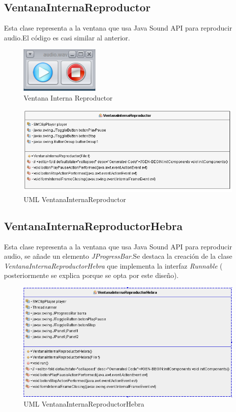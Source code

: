 \subsection{VentanaInternaReproductor}
Esta clase representa a la ventana que usa Java Sound API para reproducir audio.El código es casi similar al anterior.
\begin{figure}[H]
  \centering
    \includegraphics[scale=0.60]{images/ventanainternareproductor}
  \caption{Ventana Interna Reproductor}
  \label{Ventana Interna Reproductor}
\end{figure}

\begin{figure}[H]
  \centering
    \includegraphics[scale=0.60]{images/ventanaInternaReproductor}
  \caption{UML VentanaInternaReproductor}
  \label{VentanaInternaReproductor}
\end{figure}


\subsection{VentanaInternaReproductorHebra}
Esta clase representa a la ventana que usa Java Sound API para reproducir audio, se añade un elemento \emph{JProgressBar}.Se destaca la creación de la clase \emph{VentanaInternaReproductorHebra} que implementa la interfaz \emph{Runnable} ( posteriormente se explica porque se opta por este diseño).

\begin{figure}[H]
  \centering
    \includegraphics[scale=0.50]{images/ventanaInternaReproductorUML}
  \caption{UML VentanaInternaReproductorHebra}
  \label{VentanaInternaReproductor}
\end{figure}


